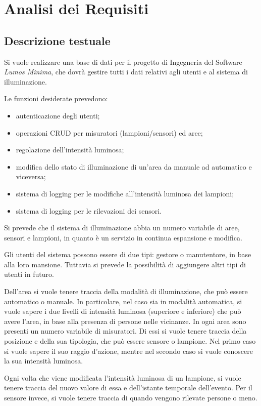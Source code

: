 \chapter{Analisi dei Requisiti}

\section{Descrizione testuale}
Si vuole realizzare una base di dati per il progetto di Ingegneria del Software \textit{Lumos Minima}, che dovrà gestire tutti i dati relativi agli utenti e al sistema di illuminazione.

Le funzioni desiderate prevedono:
\begin{itemize}
    \item autenticazione degli utenti;
    \item operazioni CRUD per misuratori (lampioni/sensori) ed aree;
    \item regolazione dell'intensità luminosa;
    \item modifica dello stato di illuminazione di un'area da manuale ad automatico e viceversa;
    \item sistema di logging per le modifiche all'intensità luminosa dei lampioni;
    \item sistema di logging per le rilevazioni dei sensori.
\end{itemize}

Si prevede che il sistema di illuminazione abbia un numero variabile di aree, sensori e lampioni, in quanto è un servizio in continua espansione e modifica.

Gli utenti del sistema possono essere di due tipi: gestore o manutentore, in base alla loro mansione. Tuttavia si prevede la possibilità di aggiungere altri tipi di utenti in futuro.

Dell'area si vuole tenere traccia della modalità di illuminazione, che può essere automatico o manuale. In particolare, nel caso sia in modalità automatica, si vuole sapere i due livelli di intensità luminosa (superiore e inferiore) che può avere l'area, in base alla presenza di persone nelle vicinanze.
In ogni area sono presenti un numero variabile di misuratori. Di essi si vuole tenere traccia della posizione e della sua tipologia, che può essere sensore o lampione. Nel primo caso si vuole sapere il suo raggio d'azione, mentre nel secondo caso si vuole conoscere la sua intensità luminosa.

Ogni volta che viene modificata l'intensità luminosa di un lampione, si vuole tenere traccia del nuovo valore di essa e dell'istante temporale dell'evento.
Per il sensore invece, si vuole tenere traccia di quando vengono rilevate persone o meno.